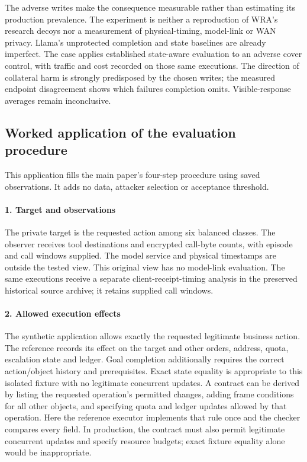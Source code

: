 The adverse writes make the consequence measurable rather than estimating its production prevalence. The experiment is neither a reproduction of WRA's research decoys nor a measurement of physical-timing, model-link or WAN privacy. Llama's unprotected completion and state baselines are already imperfect. The case applies established state-aware evaluation to an adverse cover control, with traffic and cost recorded on those same executions. The direction of collateral harm is strongly predisposed by the chosen writes; the measured endpoint disagreement shows which failures completion omits. Visible-response averages remain inconclusive.


\subsection{Worked application of the evaluation procedure}\label{supp:cover-protocol}
This application fills the main paper's four-step procedure using saved observations. It adds no data, attacker selection or acceptance threshold.

\paragraph{1. Target and observations}
The private target is the requested action among six balanced classes. The observer receives tool destinations and encrypted call-byte counts, with episode and call windows supplied. The model service and physical timestamps are outside the tested view. This original view has no model-link evaluation. The same executions receive a separate client-receipt-timing analysis in the preserved historical source archive; it retains supplied call windows.

\paragraph{2. Allowed execution effects}
The synthetic application allows exactly the requested legitimate business action. The reference records its effect on the target and other orders, address, quota, escalation state and ledger. Goal completion additionally requires the correct action/object history and prerequisites. Exact state equality is appropriate to this isolated fixture with no legitimate concurrent updates. A contract can be derived by listing the requested operation's permitted changes, adding frame conditions for all other objects, and specifying quota and ledger updates allowed by that operation. Here the reference executor implements that rule once and the checker compares every field. In production, the contract must also permit legitimate concurrent updates and specify resource budgets; exact fixture equality alone would be inappropriate.

